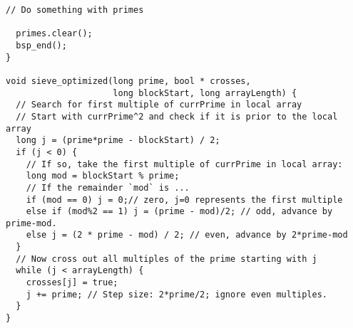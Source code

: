 \documentclass[a4paper,12pt]{article}
\begin{document}
\begin{lstlisting}[caption={Optimized parallel program for the Sieve of Eratosthenes}, label={prg:par_opt_sieve}, frame={single}]
  // Do something with primes

  primes.clear();
  bsp_end();
}

void sieve_optimized(long prime, bool * crosses,
                     long blockStart, long arrayLength) {
  // Search for first multiple of currPrime in local array
  // Start with currPrime^2 and check if it is prior to the local array
  long j = (prime*prime - blockStart) / 2;
  if (j < 0) {
    // If so, take the first multiple of currPrime in local array:
    long mod = blockStart % prime;
    // If the remainder `mod` is ...
    if (mod == 0) j = 0;// zero, j=0 represents the first multiple
    else if (mod%2 == 1) j = (prime - mod)/2; // odd, advance by prime-mod.
    else j = (2 * prime - mod) / 2; // even, advance by 2*prime-mod
  }
  // Now cross out all multiples of the prime starting with j
  while (j < arrayLength) {
    crosses[j] = true;
    j += prime; // Step size: 2*prime/2; ignore even multiples.
  }
}
	\end{lstlisting}
	
	
	
\end{document}
